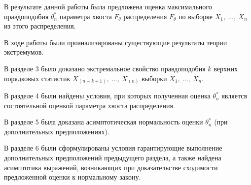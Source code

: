 В результате данной работы была предложена оценка максимального правдоподобия $\theta^\ast_n$ параметра хвоста $\overline{F}_\theta$ распределения $F_\theta$ по выборке $X_1,\:\ldots,\: X_n$ из этого распределения.

В ходе работы были проанализированы существующие результаты теории экстремумов. 

В разделе 3 было доказано экстремальное свойство правдоподобия $k$ верхних порядковых статистик $X_{(n-k+1)},\:\ldots,\: X_{(n)}$ выборки $X_1,\:\ldots,\: X_n$.

В разделе 4 были найдены условия, при которых полученная оценка $\theta^\ast_n$  является состоятельной оценкой параметра хвоста распределения. 

В разделе 5 была доказана асимптотическая нормальность оценки $\theta^\ast_n$ (при дополнительных предположениях).

В разделе 6 были сформулированы условия гарантирующие выполнение дополнительных предположений предыдущего раздела, а также найдена асимптотика выражений, возникающих при доказательстве сходимости предложенной оценки к нормальному закону. 




 